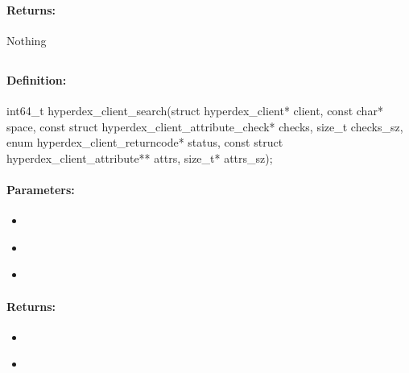 \paragraph{Returns:}
Nothing
\pagebreak
\subsection{}
\label{api:c:search}


\paragraph{Definition:}
\begin{ccode}
int64_t hyperdex_client_search(struct hyperdex_client* client,
        const char* space,
        const struct hyperdex_client_attribute_check* checks, size_t checks_sz,
        enum hyperdex_client_returncode* status,
        const struct hyperdex_client_attribute** attrs, size_t* attrs_sz);
\end{ccode}

\paragraph{Parameters:}
\begin{itemize}[noitemsep]
\item {}\\

\item {}\\

\item {}\\

\end{itemize}

\paragraph{Returns:}
\begin{itemize}[noitemsep]
\item {}\\

\item {}\\

\end{itemize}

